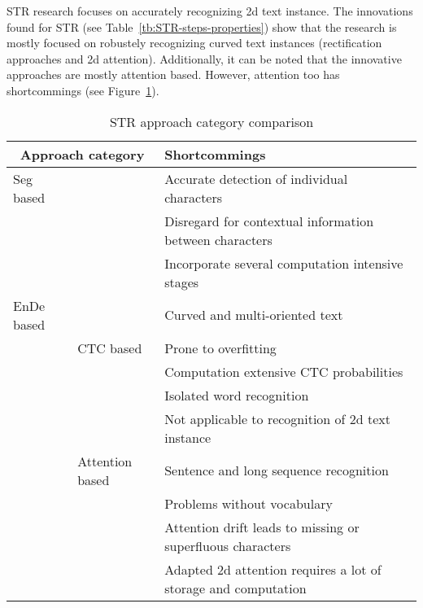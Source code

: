 \ac{STR} research focuses on accurately recognizing 2d text instance.
The innovations found for \ac{STR} (see Table~\ref{tb:STR-steps-properties}) show that the research
is mostly focused on robustely recognizing curved text instances (rectification approaches and
2d attention).
Additionally, it can be noted that the innovative approaches are mostly attention based.
However, attention too has shortcommings (see Figure~\ref{tb:STR-comparison}).
\begin{table}[h]
    \centering\scriptsize
    \begin{tabular}{p{}p{}p{}}
        \multicolumn{2}{c}{\textbf{Approach category}} & \textbf{Shortcommings} \\
        \toprule
        Seg based & & Accurate detection of individual
                        characters~\citep{chen_text_2021,cheng_aon_2018} \\
        & & Disregard for contextual information between characters~\citep{chen_text_2021} \\
        & & Incorporate several computation intensive stages~\citep{liu_abcnet_2020} \\
        \midrule
        \ac{EnDe} based & & Curved and multi-oriented text~\citep{cheng_aon_2018, long_scene_2021} \\
        & CTC based & Prone to overfitting~\citep{chen_text_2021} \\
        & & Computation extensive CTC probabilities~\citep{xie_aggregation_2019} \\
        & & Isolated word recognition~\citep{cong_comparative_2019} \\
        & & Not applicable to recognition of 2d text instance~\citep{cheng_focusing_2017,
            xie_aggregation_2019,chen_text_2021} \\
        & Attention based & Sentence and long sequence
            recognition~\citep{cong_comparative_2019,chen_text_2021} \\
        & & Problems without vocabulary~\citep{wan_vocabulary_2020} \\
        & & Attention drift leads to missing or superfluous
            characters~\citep{liao_scene_2018,xie_aggregation_2019,chen_text_2021}\\
        & & Adapted 2d attention requires a lot of storage and
            computation~\citep{xie_aggregation_2019,chen_text_2021} \\
        \bottomrule
    \end{tabular}
    \caption{STR approach category comparison\label{tb:STR-comparison}}
\end{table}
